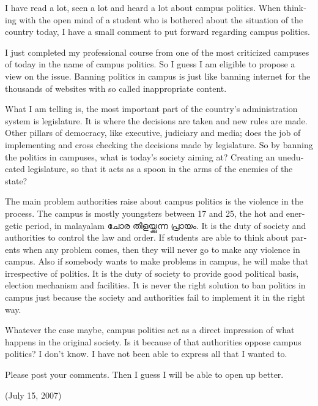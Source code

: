 \vskip 2pt
\begin{english}
I have read a lot, seen a lot and heard a lot about campus politics. 
When thinking with the open mind of a student who is bothered about 
the situation of the country today, I have a small comment to put forward regarding campus politics.

I just completed my professional course from one of the most criticized campuses of 
today in the name of campus politics. So I guess I am eligible to propose a view on the issue. 
Banning politics in campus is just like banning internet for the thousands of websites with 
so called inappropriate content.

What I am telling is, the most important part of the country’s administration system is legislature. 
It is where the decisions are taken and new rules are made. Other pillars of democracy, 
like executive, judiciary and media; does the job of implementing and cross checking the decisions 
made by legislature. So by banning the politics in campuses, what is today's society aiming at? Creating an 
uneducated legislature, so that it acts as a spoon in the arms of the enemies of the state?

The main problem authorities raise about campus politics is the violence in the process. The campus
is mostly youngsters between 17 and 25, the hot and energetic period, in malayalam \textmalayalam{ചോര തിളയ്ക്കുന്ന പ്രായം. }
It is the duty of society and authorities to control the law and order. If students are able to think about
parents when any problem comes, then they will never go to make any violence in campus. Also if somebody wants 
to make problems in campus, he will make that irrespective of politics. It is the duty of society to provide good
political basis, election mechanism and facilities. It is never the right solution to ban politics in campus just 
because the society and authorities fail to implement it in the right way. 

Whatever the case maybe, campus politics act as a direct impression of what happens in the original society. 
Is it because of that authorities oppose campus politics? I don’t know. I have not been able to express all that I wanted to. 

Please post your comments. Then I guess I will be able to open up better. 


\hspace*{2em}(July 15, 2007)
\end{english}
\newpage
